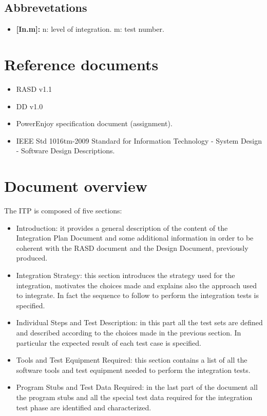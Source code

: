 \subsection{Abbrevetations}

\begin{itemize}
\item \textbf{{[In.m]}:} n: level of integration. m: test number.
\end{itemize}

\section{Reference documents}

\begin{itemize}
\item RASD v1.1
\item DD v1.0
\item PowerEnjoy specification document (assignment).
\item IEEE Std 1016tm-2009 Standard for Information Technology - System Design - Software Design Descriptions.
\end{itemize}
\section{Document overview}
The ITP is composed of five sections:
\begin{itemize}
\item Introduction: it provides a general description of the content of the Integration Plan Document and some additional information in order to be coherent with the RASD document and the Design Document, previously produced.
\item Integration Strategy: this section introduces the strategy used for the integration, motivates the choices made and explains also the approach used to integrate. In fact the sequence to follow to perform the integration tests is specified.
\item Individual Steps and Test Description: in this part all the test sets are defined and described according to the choices made in the previous section. In particular the expected result of each test case is specified.
\item Tools and Test Equipment Required: this section contains a list of all the software tools and test equipment needed to perform the integration tests.
\item Program Stubs and Test Data Required: in the last part of the document all the program stubs and all the special test data required for the integration test phase are identified and characterized.
\end{itemize}

